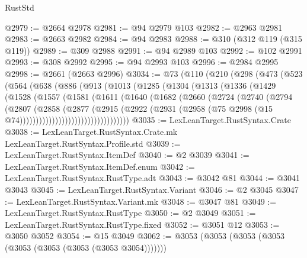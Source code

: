 \begin{lexlean}{RustStd}
\begin{coremodule}
@2979 := @2664 @2978
@2981 := @94 @2979 @103
@2982 := @2963 @2981
@2983 := @2663 @2982
@2984 := @94 @2983
@2988 := @310 (@312 @119 (@315 @119))
@2989 := @309 @2988
@2991 := @94 @2989 @103
@2992 := @102 @2991
@2993 := @308 @2992
@2995 := @94 @2993 @103
@2996 := @2984 @2995
@2998 := @2661 (@2663 @2996)
@3034 := @73
    (@110
      (@210
        (@298
          (@473
            (@523
              (@564
                (@638
                  (@886
                    (@913
                      (@1013
                        (@1285
                          (@1304
                            (@1313
                              (@1336
                                (@1429
                                  (@1528
                                    (@1557
                                      (@1581
                                        (@1611
                                          (@1640
                                            (@1682
                                              (@2660
                                                (@2724
                                                  (@2740
                                                    (@2794
                                                      (@2807
                                                        (@2858
                                                          (@2877
                                                            (@2915
                                                              (@2922
                                                                (@2931
                                                                  (@2958
                                                                    (@75
                                                                      @2998
                                                                      (@15
                                                                        @74))))))))))))))))))))))))))))))))))
@3035 := LexLeanTarget.RustSyntax.Crate
@3038 := LexLeanTarget.RustSyntax.Crate.mk LexLeanTarget.RustSyntax.Profile.std
@3039 := LexLeanTarget.RustSyntax.ItemDef
@3040 := @2 @3039
@3041 := LexLeanTarget.RustSyntax.ItemDef.enum
@3042 := LexLeanTarget.RustSyntax.RustType.adt
@3043 := @3042 @81
@3044 := @3041 @3043
@3045 := LexLeanTarget.RustSyntax.Variant
@3046 := @2 @3045
@3047 := LexLeanTarget.RustSyntax.Variant.mk
@3048 := @3047 @81
@3049 := LexLeanTarget.RustSyntax.RustType
@3050 := @2 @3049
@3051 := LexLeanTarget.RustSyntax.RustType.fixed
@3052 := @3051 @12
@3053 := @3050 @3052
@3054 := @15 @3049
@3062 := @3053 (@3053 (@3053 (@3053 (@3053 (@3053 (@3053 (@3053 @3054)))))))

\end{coremodule}
\end{lexlean}
